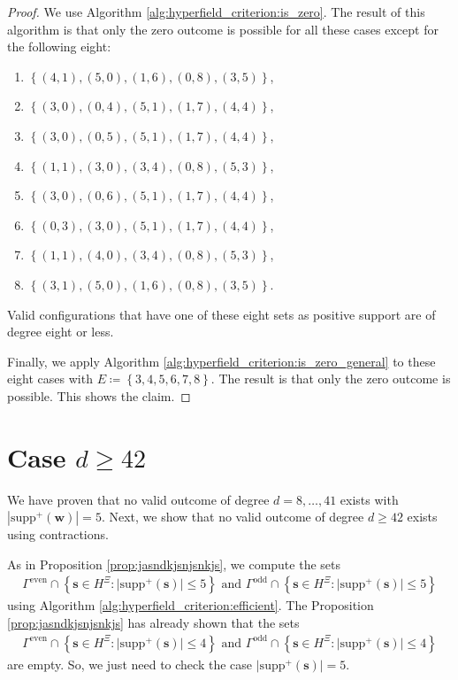 \begin{proof}
    We use Algorithm \ref{alg:hyperfield_criterion:is_zero}. The result of this algorithm is that only the zero outcome is possible for all these cases except for the following eight:
    \begin{enumerate}
        \item \( \left\{ (4, 1), (5, 0), (1, 6), (0, 8), (3, 5) \right\} \),
        \item \( \left\{  (3, 0), (0, 4), (5, 1), (1, 7), (4, 4) \right\} \),
        \item \( \left\{  (3, 0), (0, 5), (5, 1), (1, 7), (4, 4) \right\} \),
        \item \( \left\{   (1, 1), (3, 0), (3, 4), (0, 8), (5, 3) \right\} \),
        \item \( \left\{   (3, 0), (0, 6), (5, 1), (1, 7), (4, 4) \right\} \),
        \item \( \left\{   (0, 3), (3, 0), (5, 1), (1, 7), (4, 4) \right\} \),
        \item \( \left\{  (1, 1), (4, 0), (3, 4), (0, 8), (5, 3) \right\} \),
        \item \( \left\{  (3, 1), (5, 0), (1, 6), (0, 8), (3, 5) \right\} \).
    \end{enumerate}
    Valid configurations that have one of these eight sets as positive support are of degree eight or less. 
    
    Finally, we apply Algorithm \ref{alg:hyperfield_criterion:is_zero_general} to these eight cases with \( E \coloneqq \left\{ 3,4,5,6,7,8 \right\} \). The result is that only the zero outcome is possible. This shows the claim.
\end{proof}

\section{Case \( d \geq 42 \)}

We have proven that no valid outcome of degree \( d = 8, \dots, 41 \) exists with \( |\mathrm{supp}^+(\mathbf w)| = 5 \). Next, we show that no valid outcome of degree \( d \geq 42 \) exists using contractions.

As in Proposition \ref{prop:jasndkjsnjsnkjs}, we compute the sets 
\begin{gather*}
    \Gamma^{\mathrm{even}} \cap \left\{ \mathbf{s} \in H^{\Xi} : \lvert \mathrm{supp}^+(\mathbf{s}) \rvert \leq 5 \right\} \text{ and }
    \Gamma^{\mathrm{odd}} \cap \left\{ \mathbf{s} \in H^{\Xi} : \lvert \mathrm{supp}^+(\mathbf{s}) \rvert \leq 5 \right\} 
\end{gather*}
using Algorithm \ref{alg:hyperfield_criterion:efficient}. The Proposition \ref{prop:jasndkjsnjsnkjs} has already shown that the sets 
\begin{align*}
    \Gamma^{\mathrm{even}} \cap \left\{ \mathbf{s} \in H^{\Xi} : \lvert \mathrm{supp}^+(\mathbf{s}) \rvert \leq 4 \right\} \text{ and }
    \Gamma^{\mathrm{odd}} \cap \left\{ \mathbf{s} \in H^{\Xi} : \lvert \mathrm{supp}^+(\mathbf{s}) \rvert \leq 4 \right\} 
\end{align*}
are empty. So, we just need to check the case \( \lvert \mathrm{supp}^+(\mathbf{s}) \rvert = 5 \).



